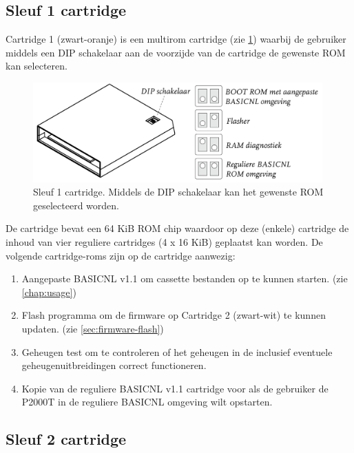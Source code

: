 %
%
%
\subsection{Sleuf 1 cartridge}

Cartridge 1 (zwart-oranje) is een  multirom cartridge (zie \cref{fig:cartridge-sleuf1}) waarbij de gebruiker middels een DIP schakelaar aan de voorzijde van de cartridge de gewenste ROM kan selecteren.

\begin{figure}[h!]
    \centering
    \includegraphics[width=0.99\textwidth]{img/slot1-cartridge.png}
    \caption{Sleuf 1 cartridge. Middels de DIP schakelaar kan het gewenste ROM geselecteerd worden.}
    \label{fig:cartridge-sleuf1}
\end{figure}

De cartridge bevat een 64 KiB ROM chip waardoor op deze (enkele) cartridge de inhoud van vier reguliere cartridges (4 x 16 KiB) geplaatst kan worden. De volgende cartridge-roms zijn op de  cartridge aanwezig:

\begin{enumerate}[noitemsep]
    \item Aangepaste BASICNL v1.1 om cassette bestanden op te kunnen starten. (zie \cref{chap:usage})
    \item Flash programma om de firmware op Cartridge 2 (zwart-wit) te kunnen updaten. (zie \cref{sec:firmware-flash})
    \item Geheugen test om te controleren of het geheugen in de  inclusief eventuele geheugenuitbreidingen correct functioneren.
    \item Kopie van de reguliere BASICNL v1.1 cartridge voor als de gebruiker de P2000T in de reguliere BASICNL omgeving wilt opstarten.
\end{enumerate}

%
%
%
\subsection{Sleuf 2 cartridge}

